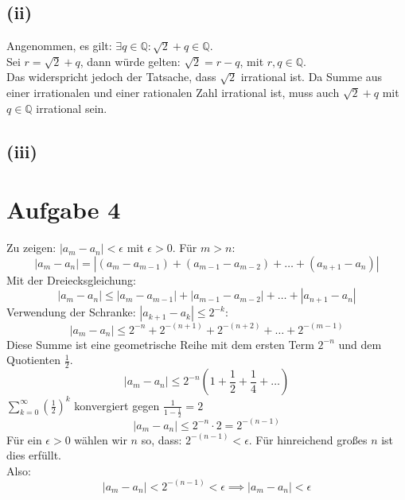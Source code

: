 \documentclass{article}
\begin{document}
\subsection*{(ii)}
Angenommen, es gilt: $\exists q \in \mathbb{Q}: \sqrt{2}+q \in \mathbb{Q}$. \\ 
Sei $r = \sqrt{2} + q$, dann würde gelten: $\sqrt{2} = r - q$, mit $r, q \in \mathbb{Q}$. \\
Das widerspricht jedoch der Tatsache, dass $\sqrt{2}$ irrational ist. Da Summe aus einer irrationalen und einer rationalen Zahl irrational ist, muss auch $\sqrt{2}+q$ mit $q \in \mathbb{Q}$ irrational sein.
\subsection*{(iii)}

\section*{Aufgabe 4}
Zu zeigen: $|a_m - a_n| < \epsilon$ mit $\epsilon > 0$.
Für $m > n$:
\[|a_m - a_n| = |(a_m - a_{m - 1}) + (a_{m-1} - a_{m-2}) + \dots + (a_{n+1} - a_n)|\]
Mit der Dreiecksgleichung:
\[|a_m - a_n| \leq |a_m - a_{m - 1}| + |a_{m-1} - a_{m-2}| + \dots + |a_{n+1} - a_n|\]
Verwendung der Schranke: $|a_{k+1} - a_k| \leq 2^{-k}$:
\[|a_m - a_n| \leq 2^{-n} + 2^{-(n+1)} + 2^{-(n+2)}+ \dots + 2^{-(m-1)}\]
Diese Summe ist eine geometrische Reihe mit dem ersten Term $2^{-n}$ und dem Quotienten $\frac{1}{2}$.
\[|a_m - a_n| \leq 2^{-n}(1 + \frac{1}{2} + \frac{1}{4} + \dots)\]
$\sum_{k=0}^{\infty} (\frac{1}{2})^k$ konvergiert gegen $\frac{1}{1 - \frac{1}{2}} = 2$
\[|a_m - a_n| \leq 2^{-n} \cdot 2 = 2^{-(n-1)}\]
Für ein $\epsilon > 0$ wählen wir $n$ so, dass: $2^{-(n-1)} < \epsilon$. Für hinreichend großes $n$ ist dies erfüllt. \\
Also:
\[|a_m - a_n| < 2^{-(n-1)} < \epsilon \implies |a_m - a_n| < \epsilon\]
\end{document}
